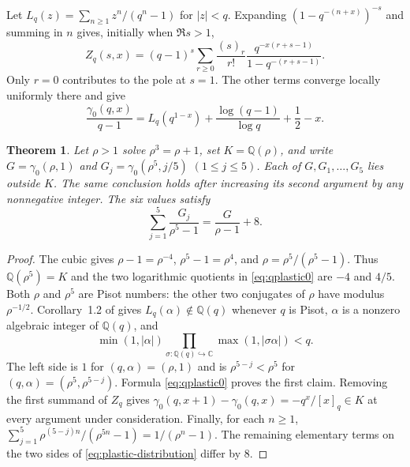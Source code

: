 \documentclass[11pt,a4paper]{article}
\newtheorem{theorem}{Theorem}[section]
\theoremstyle{definition}\newtheorem{definition}[theorem]{Definition}\newtheorem{example}[theorem]{Example}
\theoremstyle{remark}\newtheorem{remark}[theorem]{Remark}
\newcommand{\Q}{\mathbb Q}\newcommand{\Z}{\mathbb Z}\newcommand{\R}{\mathbb R}\newcommand{\N}{\mathbb N}
\begin{document}
Let $L_q(z)=\sum_{n\ge1}z^n/(q^n-1)$ for $|z|<q$.
Expanding $(1-q^{-(n+x)})^{-s}$ and summing in $n$ gives, initially when $\Re s>1$,
\[
 Z_q(s,x)=(q-1)^s\sum_{r\ge0}\frac{(s)_r}{r!}
      \frac{q^{-x(r+s-1)}}{1-q^{-(r+s-1)}}.
\]
Only $r=0$ contributes to the pole at $s=1$. The other terms converge locally uniformly there and give
\begin{equation}\label{eq:qplastic0}
 \frac{\gamma_0(q,x)}{q-1}
 =L_q(q^{1-x})+\frac{\log(q-1)}{\log q}+\frac12-x .
\end{equation}

\begin{theorem}\label{thm:plastic-six}
Let $\rho>1$ solve $\rho^3=\rho+1$, set $K=\Q(\rho)$, and write
$G=\gamma_0(\rho,1)$ and $G_j=\gamma_0(\rho^5,j/5)$ $(1\le j\le5)$.
Each of $G,G_1,\ldots,G_5$ lies outside $K$. The same conclusion holds after increasing its second argument by any nonnegative integer. The six values satisfy
\begin{equation}\label{eq:plastic-distribution}
 \sum_{j=1}^5\frac{G_j}{\rho^5-1}=\frac{G}{\rho-1}+8 .
\end{equation}
\end{theorem}
\begin{proof}
The cubic gives $\rho-1=\rho^{-4}$, $\rho^5-1=\rho^4$, and $\rho=\rho^5/(\rho^5-1)$. Thus $\Q(\rho^5)=K$ and the two logarithmic quotients in \eqref{eq:qplastic0} are $-4$ and $4/5$. Both $\rho$ and $\rho^5$ are Pisot numbers: the other two conjugates of $\rho$ have modulus $\rho^{-1/2}$. Corollary~1.2 of \cite{DKP} gives $L_q(\alpha)\notin\Q(q)$ whenever $q$ is Pisot, $\alpha$ is a nonzero algebraic integer of $\Q(q)$, and
\[
 \min(1,|\alpha|)\prod_{\sigma:\Q(q)\hookrightarrow\mathbb C}
             \max(1,|\sigma\alpha|)<q .
\]
The left side is $1$ for $(q,\alpha)=(\rho,1)$ and is $\rho^{5-j}<\rho^5$ for $(q,\alpha)=(\rho^5,\rho^{5-j})$. Formula \eqref{eq:qplastic0} proves the first claim. Removing the first summand of $Z_q$ gives
$\gamma_0(q,x+1)-\gamma_0(q,x)=-q^x/[x]_q\in K$ at every argument under consideration. Finally, for each $n\ge1$,
$\sum_{j=1}^5\rho^{(5-j)n}/(\rho^{5n}-1)=1/(\rho^n-1)$.
The remaining elementary terms on the two sides of \eqref{eq:plastic-distribution} differ by $8$.
\end{proof}
\end{document}
